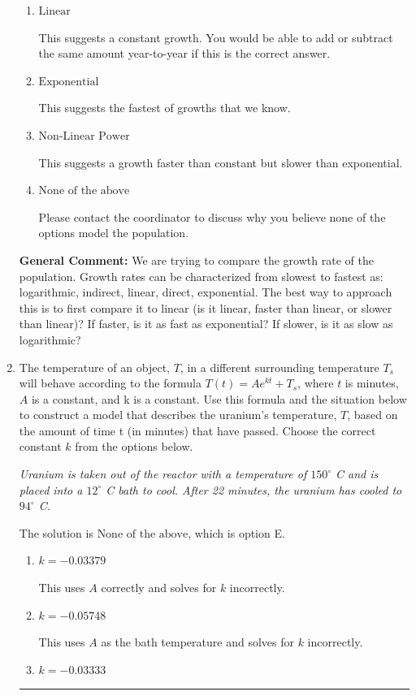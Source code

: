 \documentclass{extbook}[14pt]
\newcommand{\litem}[1]{\item #1

\rule{\textwidth}{0.4pt}}
\begin{document}
\begin{enumerate}
{\begin{enumerate}[label=\Alph*.]
This suggests the slowest of growths that we know.
\item \( \text{Linear} \)

This suggests a constant growth. You would be able to add or subtract the same amount year-to-year if this is the correct answer.
\item \( \text{Exponential} \)

This suggests the fastest of growths that we know.
\item \( \text{Non-Linear Power} \)

This suggests a growth faster than constant but slower than exponential.
\item \( \text{None of the above} \)

Please contact the coordinator to discuss why you believe none of the options model the population.
\end{enumerate}

\textbf{General Comment:} We are trying to compare the growth rate of the population. Growth rates can be characterized from slowest to fastest as: logarithmic, indirect, linear, direct, exponential. The best way to approach this is to first compare it to linear (is it linear, faster than linear, or slower than linear)? If faster, is it as fast as exponential? If slower, is it as slow as logarithmic?
}
\litem{
The temperature of an object, $T$, in a different surrounding temperature $T_s$ will behave according to the formula $T(t) = Ae^{kt} + T_s$, where $t$ is minutes, $A$ is a constant, and k is a constant. Use this formula and the situation below to construct a model that describes the uranium's temperature, $T$, based on the amount of time t (in minutes) that have passed. Choose the correct constant $k$ from the options below.

\begin{center}
    \textit{ Uranium is taken out of the reactor with a temperature of $150^{\circ}$ C and is placed into a $12^{\circ}$ C bath to cool. After 22 minutes, the uranium has cooled to $94^{\circ}$ C. }
\end{center}
The solution is \( \text{None of the above} \), which is option E.\begin{enumerate}[label=\Alph*.]
\item \( k = -0.03379 \)

This uses $A$ correctly and solves for $k$ incorrectly.
\item \( k = -0.05748 \)

This uses $A$ as the bath temperature and solves for $k$ incorrectly.
\item \( k = -0.03333 \)


\end{enumerate}}
\end{enumerate}
\end{document}
